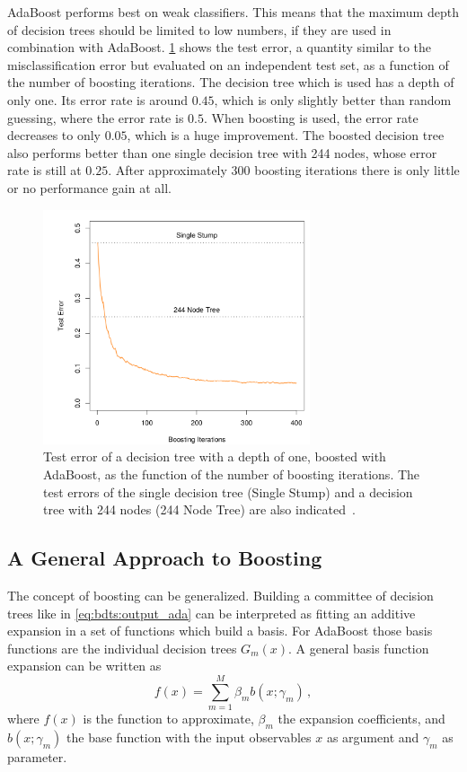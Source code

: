 AdaBoost performs best on weak classifiers.
This means that the maximum depth of decision trees should be limited to low numbers, if they are used in combination with
AdaBoost.
\cref{fig:bdt:adaboost_testerror} shows the test error, a quantity similar to the misclassification error but evaluated on
an independent test set, as a function of the number of boosting iterations.
The decision tree which is used has a depth of only one.
Its error rate is around $0.45$, which is only slightly better than random guessing, where the error rate is $0.5$.
When boosting is used, the error rate decreases to only $0.05$, which is a huge improvement.
The boosted decision tree also performs better than one single decision tree with 244 nodes, whose error rate is still at $0.25$.
After approximately 300 boosting iterations there is only little or no performance gain at all.

\begin{figure}[htb]
    \centering
    \includegraphics[width=0.7\textwidth]{./figures/bdts/adaboost_testerror.png}
    \caption{Test error of a decision tree with a depth of one, boosted with AdaBoost, as the function of the number of boosting iterations.
             The test errors of the single decision tree (Single Stump) and a decision tree with 244 nodes (244 Node Tree) are also indicated~\cite{Hastie2009}.}\label{fig:bdt:adaboost_testerror}
\end{figure}

\subsection{A General Approach to Boosting}\label{sub:bdt:boosting:general}

The concept of boosting can be generalized.
Building a committee of decision trees like in \cref{eq:bdts:output_ada} can be interpreted as
fitting an additive expansion in a set of functions which build a basis.
For AdaBoost those basis functions are the individual decision trees $G_m(x)$.
A general basis function expansion can be written as
\begin{equation}
    f(x) = \sum_{m=1}^M \beta_m b(x; \gamma_m) \,,
\end{equation}
where $f(x)$ is the function to approximate, $\beta_m$ the expansion coefficients, and $b(x; \gamma_m)$
the base function with the input observables $x$ as argument and $\gamma_m$ as parameter.

